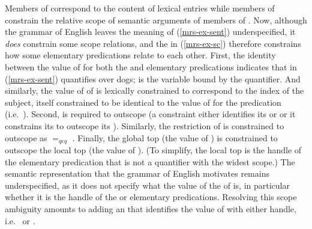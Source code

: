 \documentclass[output=paper
	        ,collection
	        ,collectionchapter
 	        ,biblatex
                ,babelshorthands
                ,newtxmath
                ,draftmode
                ,colorlinks, citecolor=brown
]{langscibook}
\begin{document}
Members of  correspond to the content of lexical entries while members of  constrain the relative scope of semantic arguments of members of . Now, although the grammar of English leaves the meaning of (\ref{mrs-ex-sent}) underspecified, it \emph{does} constrain some scope relations, and the  in (\ref{mrs-ex-sc}) therefore constrains how some elementary predications relate to each other. First, the identity between the value of  for both the  and  elementary predications indicates that  in (\ref{mrs-ex-sent}) quantifies over dogs;  %
 is the variable bound by the quantifier. And similarly, the value of  of  is lexically constrained to correspond to the index of the subject, itself constrained to be identical to the value of  for the  predication (i.e.\ ). Second,  is required to outscope  (a  constraint either identifies its  or  or it constrains its  to outscope its ). %
Similarly, the restriction of  is constrained to  outscope  as  $=_{qeq}$ . Finally, the global top (the value of ) is constrained to outscope the local top (the value of ). (To simplify, the local top is the handle of the elementary predication that is not a quantifier with the widest scope.) The semantic representation that the grammar of English motivates remains underspecified, as it does not specify what the value of the  of  is, in particular whether it is the handle of the  or  elementary predications. Resolving this scope ambiguity amounts to adding an  that identifies the value of  with either handle, i.e.\  or . 
\end{document}
